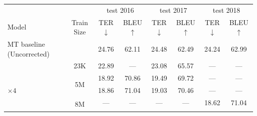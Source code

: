 \begin{landscape}
    \begin{table}[t]
        \centering
        \tlfstyle
        \begin{tabular}{lccccccc}
            \toprule
                                                             &                & \multicolumn{2}{c}{test 2016} &
            \multicolumn{2}{c}{test 2017}                    &
            \multicolumn{2}{c}{test 2018}                                                                                                      \\
            \cmidrule{3-4} \cmidrule{5-6}  \cmidrule{7-8}
            Model                                            & Train Size     & TER$\downarrow$               & BLEU$\uparrow$ &
            TER$\downarrow$                                  & BLEU$\uparrow$ & TER$\downarrow$               & BLEU$\uparrow$                 \\
            \midrule
            MT baseline (Uncorrected)                        &                &
            24.76                                            & 62.11          & 24.48                         & 62.49          & 24.24 & 62.99 \\
            \midrule
            \citet{berard2017lig}                            &
            \multicolumn{1}{c}{23K}                          &
            22.89                                            & ---            & 23.08                         & 65.57          & ---   & ---   \\
            \midrule
            \citet{junczys2018ms}                            &
            \multicolumn{1}{c}{\multirow{2}{*}{5M}}          &
            18.92                                            & 70.86          & 19.49                         & 69.72          & ---   & ---   \\
            \citet{junczys2018ms}$\times 4$                  &
            \multicolumn{1}{c}{}                             &
            18.86                                            & 71.04          & 19.03                         & 70.46          & ---   & ---   \\
            \midrule
            \citet{tebbifakhr2018multi}                      &
            \multicolumn{1}{c}{\multirow{3}{*}{8M}}          &
            ---                                              & ---            & ---                           & ---            & 18.62 & 71.04 \\
            \citet{junczys2018ms}                            &

\end{tabular}
\end{table}
\end{landscape}
